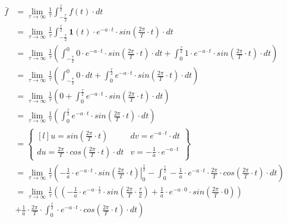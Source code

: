 \begin{align*}
\bar{f} &=\lim_{\tau \rightarrow \infty }\frac{1}{\tau}\int_{-\frac{\tau}{2}}^{\frac{\tau}{2}}f(t) \cdot dt\\
 &=\lim_{\tau \rightarrow \infty }\frac{1}{\tau}\int_{-\frac{\tau}{2}}^{\frac{\tau}{2}} \mathbf{1}(t)\cdot e^{-a\cdot t}\cdot sin\left(\frac{2\pi}{T}\cdot t \right) \cdot dt\\
 &=\lim_{\tau \rightarrow \infty }\frac{1}{\tau}\left(
 \int_{-\frac{\tau}{2}}^{0} 0 \cdot e^{-a\cdot t}\cdot sin\left(\frac{2\pi}{T}\cdot t \right) \cdot dt +
 \int_{0}^{\frac{\tau}{2}} 1 \cdot e^{-a\cdot t}\cdot sin\left(\frac{2\pi}{T}\cdot t \right) \cdot dt \right)\\
 &=\lim_{\tau \rightarrow \infty }\frac{1}{\tau}\left(
 \int_{-\frac{\tau}{2}}^{0} 0 \cdot dt +
 \int_{0}^{\frac{\tau}{2}} e^{-a\cdot t}\cdot sin\left(\frac{2\pi}{T}\cdot t \right) \cdot dt \right)\\
 &=\lim_{\tau \rightarrow \infty }\frac{1}{\tau}\left(
 0 +
 \int_{0}^{\frac{\tau}{2}} e^{-a\cdot t}\cdot sin\left(\frac{2\pi}{T}\cdot t \right) \cdot dt \right)\\
 &=\lim_{\tau \rightarrow \infty }\frac{1}{\tau}\left(
 \int_{0}^{\frac{\tau}{2}} e^{-a\cdot t}\cdot sin\left(\frac{2\pi}{T}\cdot t \right) \cdot dt \right)\\
 &=\begin{Bmatrix*}[l]
 u=sin(\frac{2\pi}{T}\cdot t) & dv = e^{-a \cdot t}\cdot dt\\ 
 du=\frac{2\pi}{T} \cdot cos(\frac{2\pi}{T}\cdot t)\cdot dt & v=-\frac{1}{a}\cdot e^{-a\cdot t}
 \end{Bmatrix*}\\
 &=\lim_{\tau \rightarrow \infty }\frac{1}{\tau}\left(
 \left. -\frac{1}{a}\cdot e^{-a\cdot t} \cdot sin \left(\frac{2\pi}{T}\cdot t\right) \right|_{0}^{\frac{\tau}{2}}
 -\int_{0}^{\frac{\tau}{2}} -\frac{1}{a}\cdot e^{-a\cdot t} \cdot \frac{2\pi}{T} \cdot cos\left(\frac{2\pi}{T}\cdot t\right)\cdot dt
 \right)\\
 &=\lim_{\tau \rightarrow \infty }\frac{1}{\tau}\left(
 \left( -\frac{1}{a}\cdot e^{-a\cdot \frac{\tau}{2}} \cdot sin \left(\frac{2\pi}{T}\cdot \frac{\tau}{2}\right) + \frac{1}{a}\cdot e^{-a\cdot 0} \cdot sin \left(\frac{2\pi}{T}\cdot 0\right) \right)\right.\\
 &\left.+\frac{1}{a} \cdot \frac{2\pi}{T} \cdot \int_{0}^{\frac{\tau}{2}} \cdot e^{-a\cdot t} \cdot cos\left(\frac{2\pi}{T}\cdot t\right)\cdot dt \right)\\

\end{align*}
